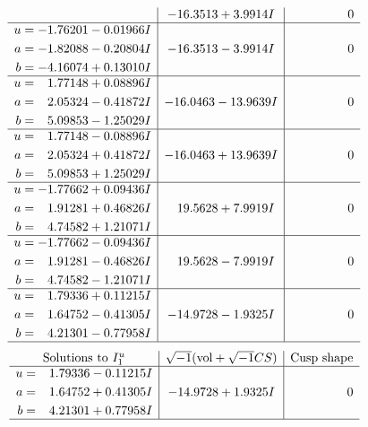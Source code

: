 \documentclass[1p]{elsarticle_modified}
\theoremstyle{definition}
\newcommand{\I}{\sqrt{-1}}
\begin{document}
$$\begin{array}{c|c|c}
 & -16.3513 + 3.9914 I & \phantom{-0.000000 } 0 \\ \hline\begin{aligned}
u &= -1.76201 - 0.01966 I \\
a &= -1.82088 - 0.20804 I \\
b &= -4.16074 + 0.13010 I\end{aligned}
 & -16.3513 - 3.9914 I & \phantom{-0.000000 } 0 \\ \hline\begin{aligned}
u &= \phantom{-}1.77148 + 0.08896 I \\
a &= \phantom{-}2.05324 - 0.41872 I \\
b &= \phantom{-}5.09853 - 1.25029 I\end{aligned}
 & -16.0463 - 13.9639 I & \phantom{-0.000000 } 0 \\ \hline\begin{aligned}
u &= \phantom{-}1.77148 - 0.08896 I \\
a &= \phantom{-}2.05324 + 0.41872 I \\
b &= \phantom{-}5.09853 + 1.25029 I\end{aligned}
 & -16.0463 + 13.9639 I & \phantom{-0.000000 } 0 \\ \hline\begin{aligned}
u &= -1.77662 + 0.09436 I \\
a &= \phantom{-}1.91281 + 0.46826 I \\
b &= \phantom{-}4.74582 + 1.21071 I\end{aligned}
 & \phantom{-}19.5628 + 7.9919 I & \phantom{-0.000000 } 0 \\ \hline\begin{aligned}
u &= -1.77662 - 0.09436 I \\
a &= \phantom{-}1.91281 - 0.46826 I \\
b &= \phantom{-}4.74582 - 1.21071 I\end{aligned}
 & \phantom{-}19.5628 - 7.9919 I & \phantom{-0.000000 } 0 \\ \hline\begin{aligned}
u &= \phantom{-}1.79336 + 0.11215 I \\
a &= \phantom{-}1.64752 - 0.41305 I \\
b &= \phantom{-}4.21301 - 0.77958 I\end{aligned}
 & -14.9728 - 1.9325 I & \phantom{-0.000000 } 0\\
 \hline 
 \end{array}$$\newpage$$\begin{array}{c|c|c}  
\text{Solutions to }I^u_{1}& \I (\text{vol} + \sqrt{-1}CS) & \text{Cusp shape}\\
 \hline 
\begin{aligned}
u &= \phantom{-}1.79336 - 0.11215 I \\
a &= \phantom{-}1.64752 + 0.41305 I \\
b &= \phantom{-}4.21301 + 0.77958 I\end{aligned}
 & -14.9728 + 1.9325 I & \phantom{-0.000000 } 0\\
 \hline 
 \end{array}$$\newpage\newpage\renewcommand{\arraystretch}{1}
\end{document}
